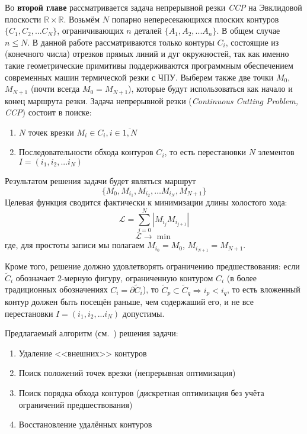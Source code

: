 
Во {\bf второй главе} 
рассматривается задача непрерывной резки {\it CCP}
на Эвклидовой плоскости
$\mathbb R \times \mathbb R$.
Возьмём
$N$
попарно непересекающихся плоских контуров
$\{C_1, C_2, ... C_N\}$,
ограничивающих
$n$
деталей
$\{A_1, A_2, ... A_n\}$.
В общем случае
$n \leqslant N$.
В данной работе рассматриваются только контуры 
$C_i$,
состоящие из
(конечного числа)
отрезков прямых линий и дуг окружностей,
так как именно такие геометрические примитивы
поддерживаются программным обеспечением
современных машин термической резки с ЧПУ.
Выберем также две точки 
$M_0$, $M_{N + 1}$
(почти всегда $M_0 = M_{N + 1}$),
которые будут использоваться
как начало и конец
маршрута резки.
Задача непрерывной резки
({\it Continuous Cutting Problem, CCP})
состоит в поиске:
\begin{enumerate}
\item
$N$ точек врезки $M_i \in C_i, i \in \overline{1, N}$
\item
Последовательности обхода контуров
$C_i$,
то есть перестановки
$N$
элементов
$I = (i_1, i_2, ... i_N)$
\end{enumerate}
Результатом решения задачи будет являться маршрут
\begin{equation}
  \{M_0, M_{i_1}, M_{i_2}, \dots M_{i_N}, M_{N + 1}\}
\end{equation}
Целевая функция
сводится фактически к минимизации длины холостого хода:
\begin{equation}
  \mathcal{L} = \sum_{j=0}^N|M_{i_j}M_{i_{j+1}}|
  \label{air-move-length}
\end{equation}
$$
\mathcal{L} \to \min
$$
где, для простоты записи мы полагаем
$M_{i_0} = M_0$,
$M_{i_{N + 1}} = M_{N + 1}$.

Кроме того, решение должно удовлетворять ограничению предшествования:
если
$\widetilde C_i$
обозначает 2-мерную фигуру,
ограниченную контуром
$C_i$
(в более традиционных обозначениях
$C_i = \partial \widetilde C_i$),
то 
$
 \widetilde C_p \subset \widetilde C_q \Rightarrow i_p < i_q 
$,
то есть вложенный контур должен быть посещён раньше,
чем содержаший его,
и не все перестановки
$I = (i_1, i_2, ... i_N)$
допустимы.

Предлагаемый алгоритм
(см.~\cite{berlin2019})
решения задачи:

\begin{enumerate}
  \item Удаление <<внешних>> контуров
  \item Поиск положений точек врезки (непрерывная оптимизация)
  \item Поиск порядка обхода контуров (дискретная оптимизация без учёта ограничений предшествования)
  \item Восстановление удалённых контуров
\end{enumerate}

